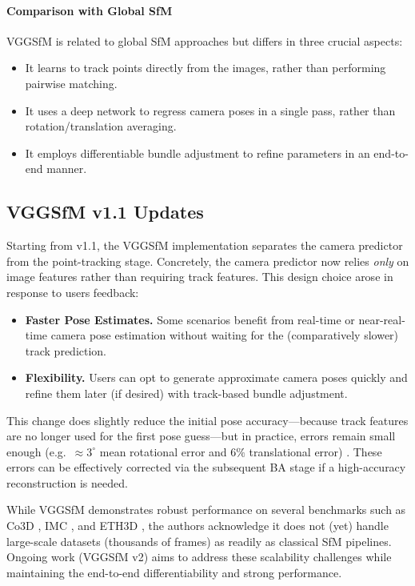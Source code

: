 \paragraph{Comparison with Global SfM}
VGGSfM is related to global SfM approaches but differs in three crucial aspects:
\begin{itemize}
    \item It learns to track points directly from the images, rather than performing pairwise matching.
    \item It uses a deep network to regress camera poses in a single pass, rather than rotation/translation averaging.
    \item It employs differentiable bundle adjustment to refine parameters in an end-to-end manner.
\end{itemize}

\subsection*{VGGSfM v1.1 Updates}
Starting from v1.1, the VGGSfM implementation separates the camera predictor from the point-tracking stage. 
Concretely, the camera predictor now relies \emph{only} on image features rather than requiring track features. 
This design choice arose in response to users feedback:
\begin{itemize}
    \item \textbf{Faster Pose Estimates.} Some scenarios benefit from real-time or near-real-time camera pose estimation without waiting for the (comparatively slower) track prediction.
    \item \textbf{Flexibility.} Users can opt to generate approximate camera poses quickly and refine them later (if desired) with track-based bundle adjustment.
\end{itemize}
This change does slightly reduce the initial pose accuracy—because track features are no longer used for the first pose guess—but in practice, errors remain small enough (e.g.\ $\approx 3^\circ$ mean rotational error and $6\%$ translational error) \cite{VGGSFM_GitHubIssue}. 
These errors can be effectively corrected via the subsequent BA stage if a high-accuracy reconstruction is needed.


While VGGSfM demonstrates robust performance on several benchmarks such as Co3D \cite{reizenstein21co3d}, IMC \cite{Jin_2020}, and ETH3D \cite{schoeps2017cvpr}, the authors acknowledge it does not (yet) handle large-scale datasets (thousands of frames) as readily as classical SfM pipelines. Ongoing work (VGGSfM v2) aims to address these scalability challenges while maintaining the end-to-end differentiability and strong performance.

